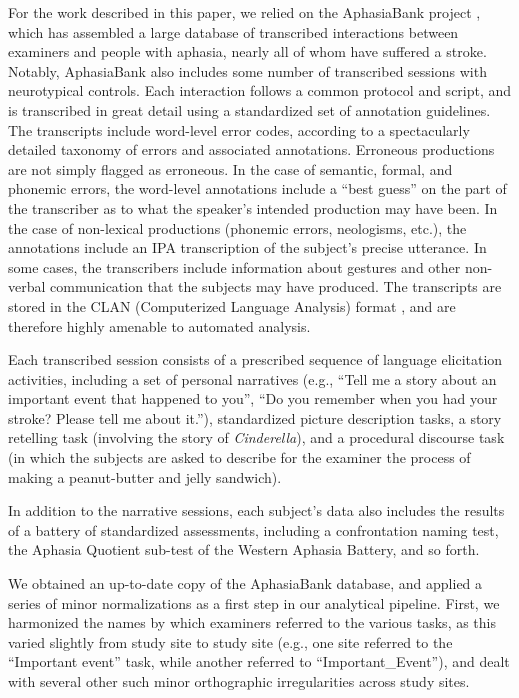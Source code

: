 For the work described in this paper, we relied on the AphasiaBank project \cite{MacWhinney:2011er}, which has assembled a large database of transcribed interactions between examiners and people with aphasia, nearly all of whom have suffered a stroke.
Notably, AphasiaBank also includes some number of transcribed sessions with neurotypical controls.
Each interaction follows a common protocol and script, and is transcribed in great detail using a standardized set of annotation guidelines.
The transcripts include word-level error codes, according to a spectacularly detailed taxonomy of errors and associated annotations.
Erroneous productions are not simply flagged as erroneous.
In the case of semantic, formal, and phonemic errors, the word-level annotations include a ``best guess'' on the part of the transcriber as to what the speaker's intended production may have been.
In the case of non-lexical productions (phonemic errors, neologisms, etc.), the annotations include an IPA transcription of the subject's precise utterance.
In some cases, the transcribers include information about gestures and other non-verbal communication that the subjects may have produced.
The transcripts are stored in the CLAN (Computerized Language Analysis) format \cite{MacWhinney:2000aa}, and are therefore highly amenable to automated analysis.

Each transcribed session consists of a prescribed sequence of language elicitation activities, including a set of personal narratives (e.g., ``Tell me a story about an important event that happened to you'', ``Do you remember when you had your stroke? Please tell me about it.''), standardized picture description tasks, a story retelling task (involving the story of \emph{Cinderella}), and a procedural discourse task (in which the subjects are asked to describe for the examiner the process of making a peanut-butter and jelly sandwich).

In addition to the narrative sessions, each subject's data also includes the results of a battery of standardized assessments, including a confrontation naming test, the Aphasia Quotient sub-test of the Western Aphasia Battery, and so forth.

We obtained an up-to-date copy of the AphasiaBank database, and applied a series of minor normalizations as a first step in our analytical pipeline. First, we harmonized the names by which examiners referred to the various tasks, as this varied slightly from study site to study site (e.g., one site referred to the ``Important event'' task, while another referred to ``Important\_Event''), and dealt with several other such minor orthographic irregularities across study sites.

